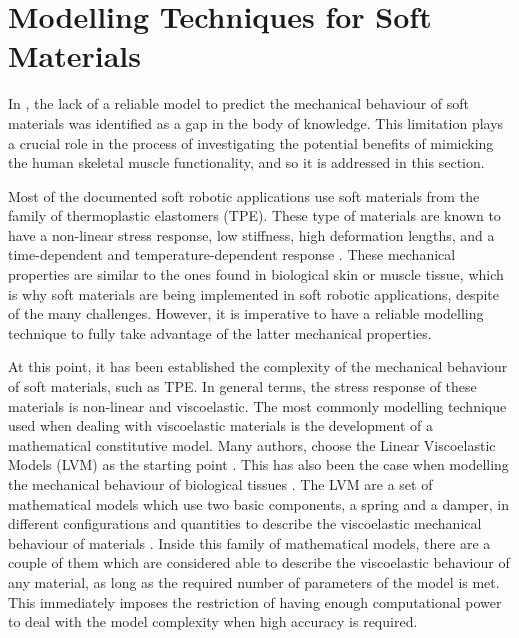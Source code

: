 \section{Modelling Techniques for Soft Materials} \label{sec:modelingTechniques}

In , the lack of a reliable model to predict the mechanical behaviour of soft materials was identified as a gap in the body of knowledge. This limitation plays a crucial role in the process of investigating the potential benefits of mimicking the human skeletal muscle functionality, and so it is addressed in this section. 

Most of the documented soft robotic applications use soft materials from the family of thermoplastic elastomers (TPE). These type of materials are known to have a non-linear stress response, low stiffness, high deformation lengths, and a time-dependent and temperature-dependent response \cite{Bauman2008}. These mechanical properties are similar to the ones found in biological skin or muscle tissue, which is why soft materials are being implemented in soft robotic applications, despite of the many challenges. However, it is imperative to have a reliable modelling technique to fully take advantage of the latter mechanical properties.

At this point, it has been established the complexity of the mechanical behaviour of soft materials, such as TPE. In general terms, the stress response of these materials is non-linear and viscoelastic. The most commonly modelling technique used when dealing with viscoelastic materials is the development of a mathematical constitutive model. Many authors, choose the Linear Viscoelastic Models (LVM) as the starting point \cite{xu2014mathematical,tirella2014strain,lu2017constitutive,ciniello2017identifying}. This has also been the case when modelling the mechanical behaviour of biological tissues \cite{sanjeevi1982viscoelastic}. The LVM are a set of mathematical models which use two basic components, a spring and a damper, in different configurations and quantities to describe the viscoelastic mechanical behaviour of materials \cite{roylance2001engineering}. Inside this family of mathematical models, there are a couple of them which are considered able to describe the viscoelastic behaviour of any material, as long as the required number of parameters of the model is met. This immediately imposes the restriction of having enough computational power to deal with the model complexity when high accuracy is required.

